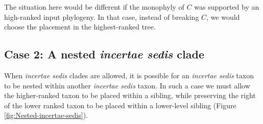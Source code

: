 \documentclass[english]{article}
\begin{document}
The situation here would be different if the monophyly of $C$ was
supported by an high-ranked input phylogeny.
In that case, instead of
breaking $C$, we would choose the placement in the highest-ranked
tree.

\subsection{Case 2: A nested \emph{incertae sedis} clade}

When \emph{incertae sedis} clades are allowed, it is possible for an
\emph{incertae sedis} taxon to be nested within another \emph{incertae
sedis} taxon.
In such a case we must allow the higher-ranked taxon to
be placed within a sibling, while preserving the right of the lower
ranked taxon to be placed within a lower-level sibling (Figure
\ref{fig:Nested-incertae-sedis}).
\end{document}
